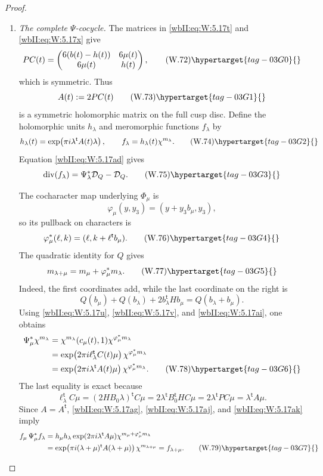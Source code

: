 \begin{proof}
\begin{enumerate}[label=\arabic*.,leftmargin=*]
\item \emph{The complete \(\Psi\)-cocycle.}
The matrices in \eqref{wbII:eq:W:5.17t} and \eqref{wbII:eq:W:5.17x} give
\[
 PC(t)=
 \begin{pmatrix}
 6(b(t)-h(t))&6\mu(t)\\
 6\mu(t)&h(t)
 \end{pmatrix},
\tag{W.72}\hypertarget{tag-03G0}{}\label{wbII:eq:W:5.17ae}
\]
which is symmetric.  Thus
\[
 A(t):=2PC(t)
\tag{W.73}\hypertarget{tag-03G1}{}\label{wbII:eq:W:5.17af}
\]
is a symmetric holomorphic matrix on the full cusp disc.  Define the
holomorphic units \(h_\lambda\) and meromorphic functions \(f_\lambda\) by
\[
 h_\lambda(t)=
 \exp\!\left(\pi i\lambda^{\mathsf t}A(t)\lambda\right),
 \qquad
 f_\lambda=h_\lambda(t)\chi^{m_\lambda}.
\tag{W.74}\hypertarget{tag-03G2}{}\label{wbII:eq:W:5.17ag}
\]
Equation \eqref{wbII:eq:W:5.17ad} gives
\[
 \operatorname{div}(f_\lambda)
 =\Psi_\lambda^*\mathcal D_Q-\mathcal D_Q.
\tag{W.75}\hypertarget{tag-03G3}{}\label{wbII:eq:W:5.17ah}
\]

The cocharacter map underlying \(\Phi_\mu\) is
\[
 \varphi_\mu(y,y_3)=(y+y_3b_\mu,y_3),
\]
so its pullback on characters is
\[
 \varphi_\mu^*(\ell,k)
 =(\ell,k+\ell^{\mathsf t}b_\mu).
\tag{W.76}\hypertarget{tag-03G4}{}\label{wbII:eq:W:5.17ai}
\]
The quadratic identity for \(Q\) gives
\[
 m_{\lambda+\mu}=m_\mu+\varphi_\mu^*m_\lambda.
\tag{W.77}\hypertarget{tag-03G5}{}\label{wbII:eq:W:5.17aj}
\]
Indeed, the first coordinates add, while the last coordinate on the
right is
\[
 Q(b_\mu)+Q(b_\lambda)+2b_\lambda^{\mathsf t}Hb_\mu
 =Q(b_\lambda+b_\mu).
\]
Using \eqref{wbII:eq:W:5.17u}, \eqref{wbII:eq:W:5.17v}, and \eqref{wbII:eq:W:5.17ai}, one obtains
\begin{align*}
 \Psi_\mu^*\chi^{m_\lambda}
 &=\chi^{m_\lambda}(c_\mu(t),1)
   \chi^{\varphi_\mu^*m_\lambda}\\
 &=\exp\!\left(2\pi i\ell_\lambda^{\mathsf t}C(t)\mu\right)
   \chi^{\varphi_\mu^*m_\lambda}\\
 &=\exp\!\left(2\pi i\lambda^{\mathsf t}A(t)\mu\right)
   \chi^{\varphi_\mu^*m_\lambda}.
\tag{W.78}\hypertarget{tag-03G6}{}\label{wbII:eq:W:5.17ak}
\end{align*}
The last equality is exact because
\[
 \ell_\lambda^{\mathsf t}C\mu
 =(2HB_0\lambda)^{\mathsf t}C\mu
 =2\lambda^{\mathsf t}B_0^{\mathsf t}HC\mu
 =2\lambda^{\mathsf t}PC\mu
 =\lambda^{\mathsf t}A\mu.
\]
Since \(A=A^{\mathsf t}\), \eqref{wbII:eq:W:5.17ag}, \eqref{wbII:eq:W:5.17aj}, and \eqref{wbII:eq:W:5.17ak} imply
\begin{align*}
 f_\mu\,\Psi_\mu^*f_\lambda
 &=h_\mu h_\lambda
   \exp(2\pi i\lambda^{\mathsf t}A\mu)
   \chi^{m_\mu+\varphi_\mu^*m_\lambda}\\
 &=\exp\!\left(
   \pi i(\lambda+\mu)^{\mathsf t}A(\lambda+\mu)\right)
   \chi^{m_{\lambda+\mu}}
 =f_{\lambda+\mu}.
\tag{W.79}\hypertarget{tag-03G7}{}\label{wbII:eq:W:5.17al}
\end{align*}


\end{enumerate}
\end{proof}
